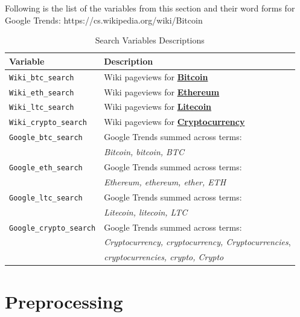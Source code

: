 Following is the list of the variables from this section and their word forms
for Google Trends:
https://cs.wikipedia.org/wiki/Bitcoin
\begin{table}[htbp]
    \centering
    \begin{threeparttable}
    \caption{Search Variables Descriptions}
    \label{tab:variables_search}
    \begin{tabular}{ll}
    \toprule
    \textbf{Variable} & \textbf{Description} \\
    \midrule
    \texttt{Wiki\_btc\_search} & Wiki pageviews for \textbf{\href{https://cs.wikipedia.org/wiki/Bitcoin}{Bitcoin}} \\
    \texttt{Wiki\_eth\_search} & Wiki pageviews for \textbf{\href{https://cs.wikipedia.org/wiki/Ethereum}{Ethereum}} \\
    \texttt{Wiki\_ltc\_search} & Wiki pageviews for \textbf{\href{https://cs.wikipedia.org/wiki/Litecoin}{Litecoin}} \\
    \texttt{Wiki\_crypto\_search} & Wiki pageviews for \textbf{\href{https://en.wikipedia.org/wiki/Cryptocurrency}{Cryptocurrency}} \\
    \texttt{Google\_btc\_search} & Google Trends summed across terms:  \\ & \textit{Bitcoin, bitcoin, BTC} \\
    \texttt{Google\_eth\_search} & Google Trends summed across terms:  \\ & \textit{Ethereum, ethereum, ether, ETH} \\
    \texttt{Google\_ltc\_search} & Google Trends summed across terms:  \\ & \textit{Litecoin, litecoin, LTC} \\
    \texttt{Google\_crypto\_search} & Google Trends summed across terms: \\ & \textit{Cryptocurrency, cryptocurrency, Cryptocurrencies}, \\ & \textit{cryptocurrencies, crypto, Crypto} \\
    \bottomrule
    \end{tabular}
    \end{threeparttable}
\end{table}


\section{Preprocessing}


